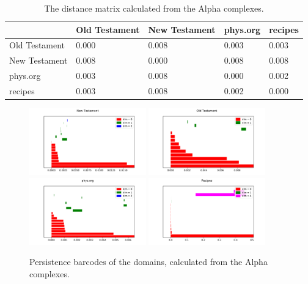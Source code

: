 \documentclass[12pt,a4paper]{amsart}
\begin{document}
\begin{table}
  \centering
  \begin{tabular}{l|llll}
                  & Old Testament & New Testament & phys.org & recipes \\ \hline
    Old Testament & 0.000 & 0.008 & 0.003 & 0.003 \\
    New Testament & 0.008 & 0.000 & 0.008 & 0.008 \\
    phys.org      & 0.003 & 0.008 & 0.000 & 0.002 \\
    recipes       & 0.003 & 0.008 & 0.002 & 0.000 \\
  \end{tabular}

  \caption{The distance matrix calculated from the Alpha complexes.}
  \label{tab:alpha}
\end{table}

\begin{figure}
  \centering
  \includegraphics[width=0.45\textwidth]{../plots/barcodes/bible-new-alpha}
  \includegraphics[width=0.45\textwidth]{../plots/barcodes/bible-old-alpha}
  \includegraphics[width=0.45\textwidth]{../plots/barcodes/phys-alpha}
  \includegraphics[width=0.45\textwidth]{../plots/barcodes/recipes-alpha}
  \caption{Persistence barcodes of the domains, calculated from the Alpha
    complexes.}
  \label{fig:barcode:alpha}
\end{figure}
\end{document}
